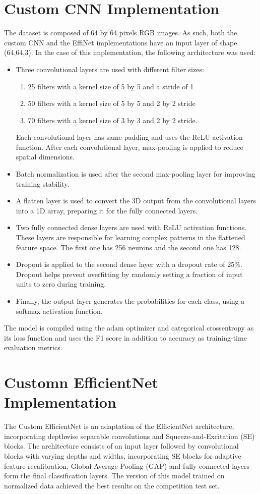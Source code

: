 \documentclass{article}
\begin{document}
\section{Custom CNN Implementation}
The dataset is composed of 64 by 64 pixels RGB images. As such, both the custom CNN and the EffiNet implementations have an input layer of shape (64,64,3). In the case of this implementation, the following architecture was used:
\begin{itemize}
\item Three convolutional layers are used with different filter sizes: 
\begin{enumerate}
\item 25 filters with a kernel size of 5 by 5 and a stride of 1
\item 50 filters with a kernel size of 5 by 5 and 2 by 2 stride
\item 70 filters with a kernel size of 3 by 3 and 2 by 2 stride.
\end{enumerate}
Each convolutional layer has same padding and uses the ReLU activation function. After each convolutional layer, max-pooling is applied to reduce spatial dimensions. 
\item Batch normalization is used after the second max-pooling layer for improving training stability.
\item A flatten layer is used to convert the 3D output from the convolutional layers into a 1D array, preparing it for the fully connected layers.
\item Two fully connected dense layers are used with ReLU activation functions. These layers are responsible for learning complex patterns in the flattened feature space. The first one has 256 neurons and the second one has 128.
\item Dropout is applied to the second dense layer with a dropout rate of 25\%. Dropout helps prevent overfitting by randomly setting a fraction of input units to zero during training.
\item Finally, the output layer generates the probabilities for each class, using a softmax activation function.
\end{itemize}
The model is compiled using the adam optimizer and categorical crossentropy as its loss function and uses the F1 score in addition to accuracy as training-time evaluation metrics.

\section{Customn EfficientNet Implementation}
The Custom EfficientNet is an adaptation of the EfficientNet architecture, incorporating depthwise separable convolutions and Squeeze-and-Excitation (SE) blocks. The architecture consists of an input layer followed by convolutional blocks with varying depths and widths, incorporating SE blocks for adaptive feature recalibration. Global Average Pooling (GAP) and fully connected layers form the final classification layers. The version of this model trained on normalized data achieved the best results on the competition test set.
\end{document}
